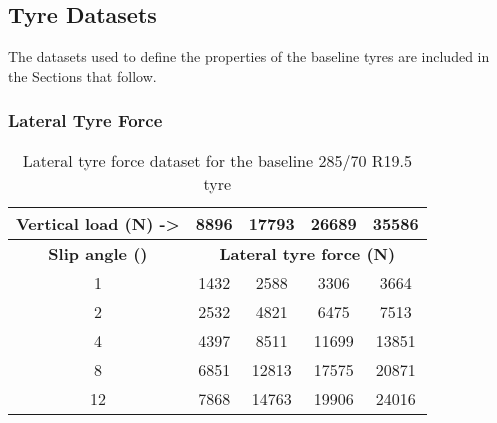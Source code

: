 
\subsection{Tyre Datasets}\label{section:baseline-tyre-datasets}

The datasets used to define the properties of the baseline tyres are included in the Sections that follow.

\subsubsection{Lateral Tyre Force}\label{section:lateral-tyre-force-trucksim-datasets}


\begin{table}[H]
	\centering\footnotesize
	\caption{Lateral tyre force dataset for the baseline 285/70 R19.5 tyre}
	\begin{tabular}{|c|c|c|c|c|}
		\hline
		\textbf{Vertical load (N) ->} & 8896 & 17793 & 26689 & 35586 \bigstrut \\
		\hline
		\textbf{Slip angle (\degree{})} & \multicolumn{4}{c|}{\textbf{Lateral tyre force (N)}} \bigstrut\\
		\hline
		1                             & 1432 & 2588  & 3306  & 3664 \bigstrut  \\
		\hline
		2                             & 2532 & 4821  & 6475  & 7513 \bigstrut  \\
		\hline
		4                             & 4397 & 8511  & 11699 & 13851 \bigstrut \\
		\hline
		8                             & 6851 & 12813 & 17575 & 20871 \bigstrut \\
		\hline
		12                            & 7868 & 14763 & 19906 & 24016 \bigstrut \\
		\hline
	\end{tabular}%
	\label{table:baseline-lateral-tyre-force-dataset-285-70-22.5}%
\end{table}%


